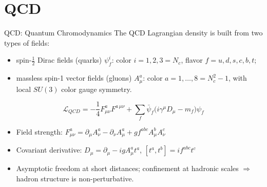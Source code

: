\section{QCD}

\begin{frame}{QCD: Quantum Chromodynamics}
  The QCD Lagrangian density is built from two types of fields:
  \begin{itemize}
    \item spin-$\frac12$ Dirac fields (quarks) $\psi^{i}_{f}$: color $i = 1, 2, 3 = N_c$, flavor $f=u,d,s,c,b,t$;
    \item massless spin-1 vector fields (gluons) $A_{\mu}^{a}$: color $a=1,\ldots,8=N_c^{2}-1$, with local $SU(3)$ color gauge symmetry.
  \end{itemize}
  \[ \boxed{\mathcal{L}_{QCD}=-\frac{1}{4}F^{a}_{\mu\nu}F^{a\,\mu\nu}+\sum_{f}\bar{\psi}_{f}\big(i\gamma^{\mu}D_{\mu}-m_{f}\big)\psi_{f}} \]
  \begin{itemize}
    \item Field strength: $F^a_{\mu\nu}=\partial_{\mu}A^a_{\nu}-\partial_{\nu}A^a_{\mu}+g f^{abc}A^b_{\mu}A^c_{\nu}$
    \item Covariant derivative: $D_{\mu}=\partial_{\mu}-igA^a_{\mu}t^{a}$, \quad $[t^{a},t^{b}]=if^{abc}t^{c}$
    \item Asymptotic freedom at short distances; confinement at hadronic scales $\Rightarrow$ hadron structure is non-perturbative.
  \end{itemize}
\end{frame}

